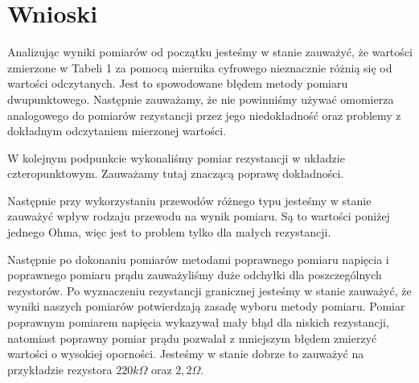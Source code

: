 {\section{Wnioski}}
Analizując wyniki pomiarów od początku jesteśmy w stanie zauważyć, że wartości zmierzone w Tabeli 1 za pomocą miernika cyfrowego nieznacznie różnią się od wartości odczytanych. Jest to spowodowane błędem metody pomiaru dwupunktowego. Następnie zauważamy, że nie powinniśmy używać omomierza analogowego do pomiarów rezystancji przez jego niedokładność oraz problemy z dokładnym odczytaniem mierzonej wartości.

W kolejnym podpunkcie wykonaliśmy pomiar rezystancji w układzie czteropunktowym. Zauważamy tutaj znaczącą poprawę dokładności.

Następnie przy wykorzystaniu przewodów różnego typu jesteśmy w stanie zauważyć wpływ rodzaju przewodu na wynik pomiaru. Są to wartości poniżej jednego Ohma, więc jest to problem tylko dla małych rezystancji.

Następnie po dokonaniu pomiarów metodami poprawnego pomiaru napięcia i poprawnego pomiaru prądu zauważyliśmy duże odchyłki dla poszczególnych rezystorów.
Po wyznaczeniu rezystancji granicznej jesteśmy w stanie zauważyć, że wyniki naszych pomiarów potwierdzają zasadę wyboru metody pomiaru. Pomiar poprawnym pomiarem napięcia wykazywał mały błąd dla niskich rezystancji, natomiast poprawny pomiar prądu pozwalał z mniejszym błędem zmierzyć wartości o wysokiej oporności. Jesteśmy w stanie dobrze to zauważyć na przykładzie rezystora $220k\Omega$ oraz $2,2\Omega$.
